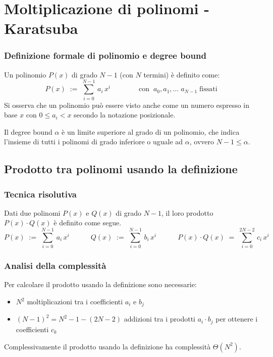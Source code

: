 \newpage

\section{Moltiplicazione di polinomi - Karatsuba}
\subsubsection*{Definizione formale di polinomio e degree bound}
Un polinomio \(P(x)\) di grado \(N-1\) (con \(N\) termini) è definito come:
\[P(x) \; := \; \sum_{i=0}^{N-1} \, a_i \, x^i \qquad\qquad \text{con} \;\; a_0, a_1, \dotsc \; a_{N-1} \; \text{fissati}\]
Si osserva che un polinomio può essere visto anche come un numero espresso in base \(x\) con \(0\leq a_i < x\) secondo la
notazione posizionale.

Il degree bound \(\alpha\) è un limite superiore al grado di un polinomio, che indica l'insieme di tutti i polinomi di
grado inferiore o uguale ad \(\alpha\), ovvero \(N - 1 \leq \alpha\).

\subsection{Prodotto tra polinomi usando la definizione}
\subsubsection*{Tecnica risolutiva}
Dati due polinomi \(P(x)\) e \(Q(x)\) di grado \(N - 1\), il loro prodotto \(P(x) \cdot Q(x)\) è definito come segue.
\[P(x) \; := \; \sum_{i=0}^{N-1} \, a_i \, x^i \qquad\quad Q(x) \; := \; \sum_{i=0}^{N-1} \, b_i \, x^i \qquad\quad P(x) \cdot Q(x) \; = \; \sum_{i=0}^{2N-2} \, c_i \, x^i\]

\subsubsection*{Analisi della complessità}
Per calcolare il prodotto usando la definizione sono necessarie:
\begin{itemize}
	\item \(N^2\) moltiplicazioni tra i coefficienti \(a_i\) e \(b_j\)
	\item \((N-1)^2 = N^2 - 1 - (2N - 2)\) addizioni tra i prodotti \(a_i \cdot b_j\) per ottenere i coefficienti \(c_k\)
\end{itemize}
Complessivamente il prodotto usando la definizione ha complessità \(\Theta(N^2)\).

